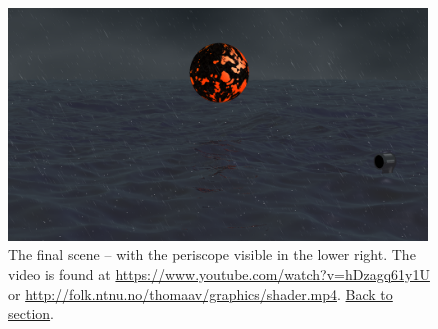 \documentclass[abstract=off,oneside]{scrreprt}
\begin{document}
\begin{figure}[htb]
\centering
\includegraphics[width=0.99\textwidth]{./img/finalscene.png}
\caption*{\label{fig:finalscene}The final scene -- with the periscope visible in the lower right. The video is found at \url{https://www.youtube.com/watch?v=hDzagq61y1U} or \url{http://folk.ntnu.no/thomaav/graphics/shader.mp4}. \hyperref[sec:periscope]{Back to section}.}
\end{figure}
\end{document}
